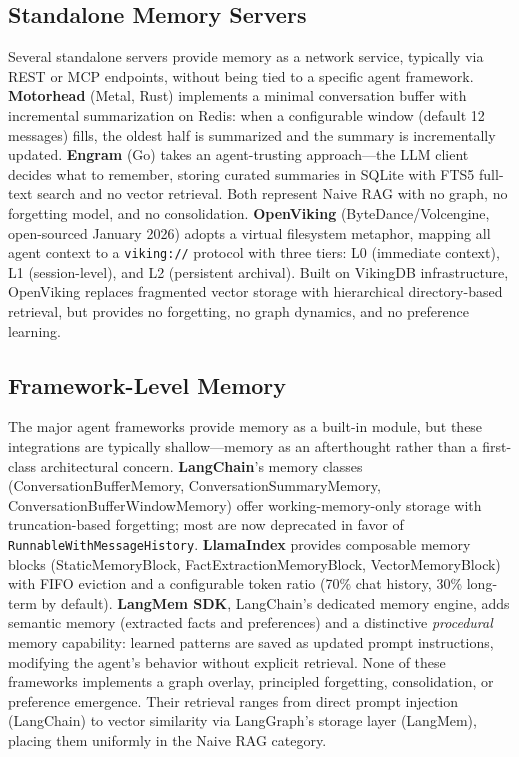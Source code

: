 \subsection{Standalone Memory Servers}
\label{sec:standalone}

Several standalone servers provide memory as a network service,
typically via REST or MCP endpoints, without being tied to a specific
agent framework. \textbf{Motorhead} (Metal, Rust) implements a
minimal conversation buffer with incremental summarization on Redis:
when a configurable window (default 12 messages) fills, the oldest
half is summarized and the summary is incrementally updated.
\textbf{Engram} (Go) takes an agent-trusting approach---the LLM
client decides what to remember, storing curated summaries in SQLite
with FTS5 full-text search and no vector retrieval. Both represent
Naive RAG with no graph, no forgetting model, and no consolidation.
\textbf{OpenViking} (ByteDance/Volcengine, open-sourced January 2026)
adopts a virtual filesystem metaphor, mapping all agent context to a
\texttt{viking://} protocol with three tiers: L0 (immediate context),
L1 (session-level), and L2 (persistent archival). Built on VikingDB
infrastructure, OpenViking replaces fragmented vector storage with
hierarchical directory-based retrieval, but provides no forgetting,
no graph dynamics, and no preference learning.

\subsection{Framework-Level Memory}
\label{sec:framework}

The major agent frameworks provide memory as a built-in module, but
these integrations are typically shallow---memory as an afterthought
rather than a first-class architectural concern. \textbf{LangChain}'s
memory classes (ConversationBufferMemory, ConversationSummaryMemory,
ConversationBufferWindowMemory) offer working-memory-only storage with
truncation-based forgetting; most are now deprecated in favor of
\texttt{RunnableWithMessageHistory}. \textbf{LlamaIndex} provides
composable memory blocks (StaticMemoryBlock,
FactExtractionMemoryBlock, VectorMemoryBlock) with FIFO eviction and
a configurable token ratio (70\% chat history, 30\% long-term by
default). \textbf{LangMem SDK}, LangChain's dedicated memory engine,
adds semantic memory (extracted facts and preferences) and a
distinctive \emph{procedural} memory capability: learned patterns are
saved as updated prompt instructions, modifying the agent's behavior
without explicit retrieval. None of these frameworks implements a
graph overlay, principled forgetting, consolidation, or preference
emergence. Their retrieval ranges from direct prompt injection
(LangChain) to vector similarity via LangGraph's storage layer
(LangMem), placing them uniformly in the Naive RAG category.

